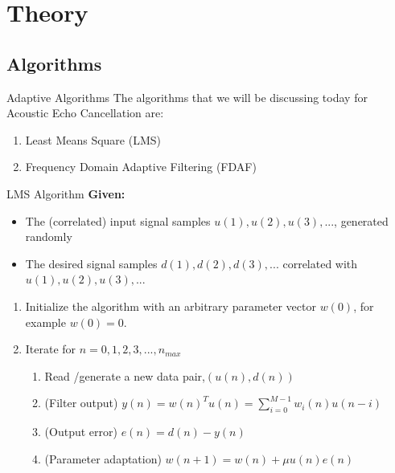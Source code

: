 \documentclass[xcolor=dvipsnames]{beamer}
\begin{document}
\section{Theory}

\subsection{Algorithms}
\begin{frame}{Adaptive Algorithms}
The algorithms that we will be discussing today for Acoustic Echo Cancellation are:
	\begin{enumerate}
		\item Least Means Square (LMS)
		\item Frequency Domain Adaptive Filtering (FDAF)
	\end{enumerate}
\end{frame}

\begin{frame}{LMS Algorithm}
\textbf{Given:}
\begin{itemize}
	\item The (correlated) input signal samples ${u(1),u(2),u(3),...}$,
generated randomly
	\item The desired signal samples ${d(1),d(2),d(3),...}$ correlated
with ${u(1),u(2),u(3),...}$
\end{itemize}

	\begin{enumerate}
		\item Initialize the algorithm with an arbitrary parameter vector $w(0)$, for example $w(0) = 0$.
		\item Iterate for $n = 0,1,2,3,...,n_{max}$
			\begin{enumerate}[I]
				\item Read /generate a new data pair,\hfill $(u(n),d(n))$
				\item (Filter output) \hfill $y(n) = w(n)^T u(n) = \sum_{i=0}^{M-1} w_i(n)u(n-i)$
				\item (Output error) \hfill $e(n) = d(n) − y(n)$
				\item (Parameter adaptation) \hfill $w(n + 1) = w(n) + \mu u(n)e(n)$
			\end{enumerate}
	\end{enumerate}
\end{frame}
\end{document}
